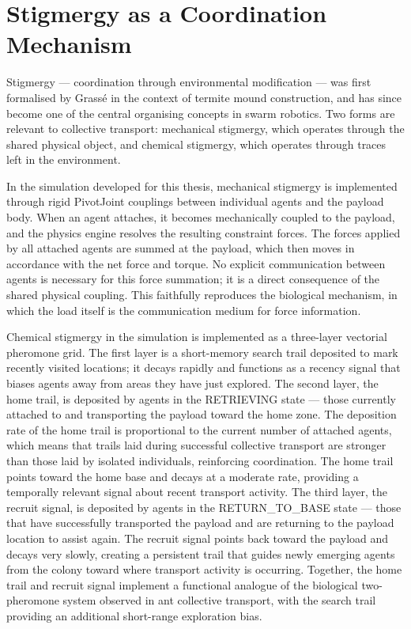 \section{Stigmergy as a Coordination Mechanism}
\label{sec:stigmergy}

Stigmergy — coordination through environmental modification — was first formalised by Grassé in the context of termite mound construction, and has since become one of the central organising concepts in swarm robotics. Two forms are relevant to collective transport: mechanical stigmergy, which operates through the shared physical object, and chemical stigmergy, which operates through traces left in the environment.

In the simulation developed for this thesis, mechanical stigmergy is implemented through rigid PivotJoint couplings between individual agents and the payload body. When an agent attaches, it becomes mechanically coupled to the payload, and the physics engine resolves the resulting constraint forces. The forces applied by all attached agents are summed at the payload, which then moves in accordance with the net force and torque. No explicit communication between agents is necessary for this force summation; it is a direct consequence of the shared physical coupling. This faithfully reproduces the biological mechanism, in which the load itself is the communication medium for force information.

Chemical stigmergy in the simulation is implemented as a three-layer vectorial pheromone grid. The first layer is a short-memory search trail deposited to mark recently visited locations; it decays rapidly and functions as a recency signal that biases agents away from areas they have just explored. The second layer, the home trail, is deposited by agents in the RETRIEVING state — those currently attached to and transporting the payload toward the home zone. The deposition rate of the home trail is proportional to the current number of attached agents, which means that trails laid during successful collective transport are stronger than those laid by isolated individuals, reinforcing coordination. The home trail points toward the home base and decays at a moderate rate, providing a temporally relevant signal about recent transport activity. The third layer, the recruit signal, is deposited by agents in the RETURN\_TO\_BASE state — those that have successfully transported the payload and are returning to the payload location to assist again. The recruit signal points back toward the payload and decays very slowly, creating a persistent trail that guides newly emerging agents from the colony toward where transport activity is occurring. Together, the home trail and recruit signal implement a functional analogue of the biological two-pheromone system observed in ant collective transport, with the search trail providing an additional short-range exploration bias.

